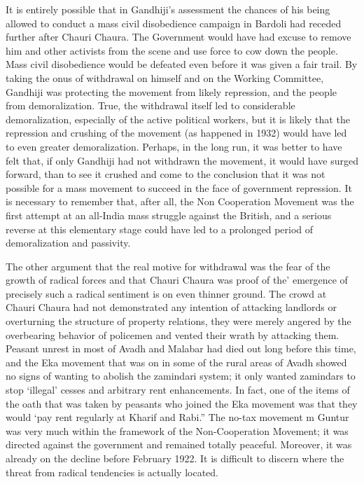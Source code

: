 It is entirely possible that in Gandhiji’s assessment the chances of his being allowed to conduct a mass civil disobedience campaign in Bardoli had receded further after Chauri Chaura. The Government would have had excuse to remove him and other activists from the scene and use force to cow down the people. Mass civil disobedience would be defeated even before it was given a fair trail. By taking the onus of withdrawal on himself and on the Working Committee, Gandhiji was protecting the movement from likely repression, and the people from demoralization. True, the withdrawal itself led to considerable demoralization, especially of the active political workers, but it is likely that the repression and crushing of the movement (as happened in 1932) would have led to even greater demoralization. Perhaps, in the long run, it was better to have felt that, if only Gandhiji had not withdrawn the movement, it would have surged forward, than to see it crushed and come to the conclusion that it was not possible for a mass movement to succeed in the face of government repression. It is necessary to remember that, after all, the Non Cooperation Movement was the first attempt at an all-India mass struggle against the British, and a serious reverse at this elementary stage could have led to a prolonged period of demoralization and passivity. 

The other argument that the real motive for withdrawal was the fear of the growth of radical forces and that Chauri Chaura was proof of the’ emergence of precisely such a radical sentiment is on even thinner ground. The crowd at Chauri Chaura had not demonstrated any intention of attacking landlords or overturning the structure of property relations, they were merely angered by the overbearing behavior of policemen and vented their wrath by attacking them. Peasant unrest in most of Avadh and Malabar had died out long before this time, and the Eka movement that was on in some of the rural areas of Avadh showed no signs of wanting to abolish the zamindari system; it only wanted zamindars to stop ‘illegal’ cesses and arbitrary rent enhancements. In fact, one of the items of the oath that was taken by peasants who joined the Eka movement was that they would ‘pay rent regularly at Kharif and Rabi.” The no-tax movement m Guntur was very much within the framework of the Non-Cooperation Movement; it was directed against the government and remained totally peaceful. Moreover, it was already on the decline before February 1922. It is difficult to discern where the threat from radical tendencies is actually located. 

